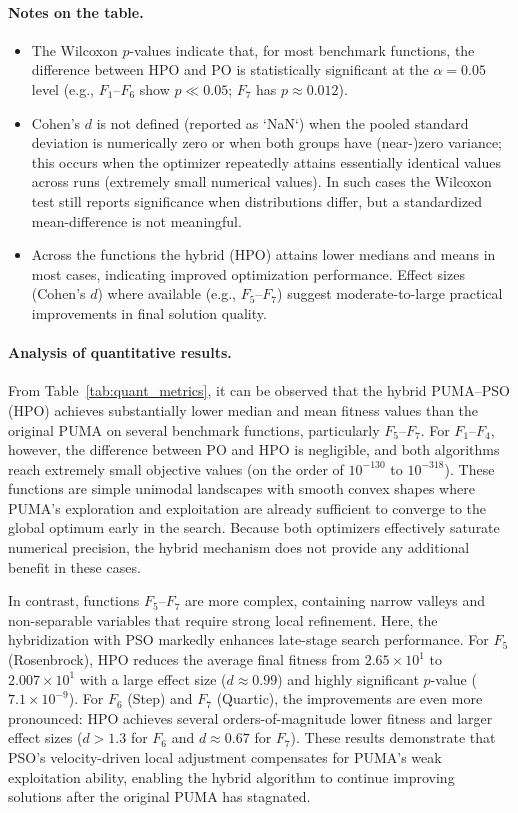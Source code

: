 \documentclass[a4paper,12pt]{article}
\begin{document}
\paragraph{Notes on the table.}
\begin{itemize}
  \item The Wilcoxon \(p\)-values indicate that, for most benchmark functions, the difference between HPO and PO is statistically significant at the \(\alpha=0.05\) level (e.g., \(F_1\)–\(F_6\) show \(p \ll 0.05\); \(F_7\) has \(p\approx 0.012\)).  
  \item Cohen's \(d\) is not defined (reported as `NaN`) when the pooled standard deviation is numerically zero or when both groups have (near-)zero variance; this occurs when the optimizer repeatedly attains essentially identical values across runs (extremely small numerical values). In such cases the Wilcoxon test still reports significance when distributions differ, but a standardized mean-difference is not meaningful.
  \item Across the functions the hybrid (HPO) attains lower medians and means in most cases, indicating improved optimization performance. Effect sizes (Cohen's \(d\)) where available (e.g., \(F_5\)--\(F_7\)) suggest moderate-to-large practical improvements in final solution quality.
\end{itemize}

\paragraph{Analysis of quantitative results.}
From Table~\ref{tab:quant_metrics}, it can be observed that the hybrid PUMA--PSO (HPO) achieves substantially lower median and mean fitness values than the original PUMA on several benchmark functions, particularly $F_5$--$F_7$. 
For $F_1$--$F_4$, however, the difference between PO and HPO is negligible, and both algorithms reach extremely small objective values (on the order of $10^{-130}$ to $10^{-318}$). 
These functions are simple unimodal landscapes with smooth convex shapes where PUMA's exploration and exploitation are already sufficient to converge to the global optimum early in the search. 
Because both optimizers effectively saturate numerical precision, the hybrid mechanism does not provide any additional benefit in these cases.

In contrast, functions $F_5$--$F_7$ are more complex, containing narrow valleys and non-separable variables that require strong local refinement. 
Here, the hybridization with PSO markedly enhances late-stage search performance. 
For $F_5$ (Rosenbrock), HPO reduces the average final fitness from $2.65\times10^{1}$ to $2.007\times10^{1}$ with a large effect size ($d\approx0.99$) and highly significant $p$-value ($7.1\times10^{-9}$). 
For $F_6$ (Step) and $F_7$ (Quartic), the improvements are even more pronounced: HPO achieves several orders-of-magnitude lower fitness and larger effect sizes ($d>1.3$ for $F_6$ and $d\approx0.67$ for $F_7$). 
These results demonstrate that PSO’s velocity-driven local adjustment compensates for PUMA’s weak exploitation ability, enabling the hybrid algorithm to continue improving solutions after the original PUMA has stagnated.
\end{document}
